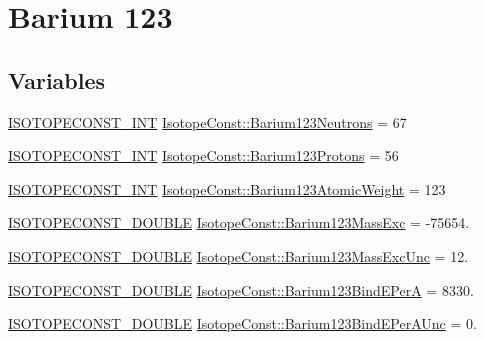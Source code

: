 \hypertarget{group___isotope_const-_barium-_ba123}{}\section{Barium 123}
\label{group___isotope_const-_barium-_ba123}
\subsection*{Variables}
\begin{DoxyCompactItemize}
\item 
\mbox{\hyperlink{group___isotope_const-_macros_ga5f18360b3e99483a35c32d789e62621c}{I\+S\+O\+T\+O\+P\+E\+C\+O\+N\+S\+T\+\_\+\+I\+NT}} \mbox{\hyperlink{group___isotope_const-_barium-_ba123_ga14435cc2003caa169279a4ffc244e4de}{Isotope\+Const\+::\+Barium123\+Neutrons}} = 67
\item 
\mbox{\hyperlink{group___isotope_const-_macros_ga5f18360b3e99483a35c32d789e62621c}{I\+S\+O\+T\+O\+P\+E\+C\+O\+N\+S\+T\+\_\+\+I\+NT}} \mbox{\hyperlink{group___isotope_const-_barium-_ba123_ga71c5c894797ec8bb11398a098c2d9287}{Isotope\+Const\+::\+Barium123\+Protons}} = 56
\item 
\mbox{\hyperlink{group___isotope_const-_macros_ga5f18360b3e99483a35c32d789e62621c}{I\+S\+O\+T\+O\+P\+E\+C\+O\+N\+S\+T\+\_\+\+I\+NT}} \mbox{\hyperlink{group___isotope_const-_barium-_ba123_gafa4c5d3ec3ad05ae329e857c1d85517e}{Isotope\+Const\+::\+Barium123\+Atomic\+Weight}} = 123
\item 
\mbox{\hyperlink{group___isotope_const-_macros_ga8f45a7272ce02c0b4c65c44636ed719a}{I\+S\+O\+T\+O\+P\+E\+C\+O\+N\+S\+T\+\_\+\+D\+O\+U\+B\+LE}} \mbox{\hyperlink{group___isotope_const-_barium-_ba123_ga63a7cc06bec4273fb409c4a6e903a99b}{Isotope\+Const\+::\+Barium123\+Mass\+Exc}} = -\/75654.
\item 
\mbox{\hyperlink{group___isotope_const-_macros_ga8f45a7272ce02c0b4c65c44636ed719a}{I\+S\+O\+T\+O\+P\+E\+C\+O\+N\+S\+T\+\_\+\+D\+O\+U\+B\+LE}} \mbox{\hyperlink{group___isotope_const-_barium-_ba123_gafeefe702a28c158415e2f36e984e4d90}{Isotope\+Const\+::\+Barium123\+Mass\+Exc\+Unc}} = 12.
\item 
\mbox{\hyperlink{group___isotope_const-_macros_ga8f45a7272ce02c0b4c65c44636ed719a}{I\+S\+O\+T\+O\+P\+E\+C\+O\+N\+S\+T\+\_\+\+D\+O\+U\+B\+LE}} \mbox{\hyperlink{group___isotope_const-_barium-_ba123_ga37dea9f1f058a7848f7d319e538e6359}{Isotope\+Const\+::\+Barium123\+Bind\+E\+PerA}} = 8330.
\item 
\mbox{\hyperlink{group___isotope_const-_macros_ga8f45a7272ce02c0b4c65c44636ed719a}{I\+S\+O\+T\+O\+P\+E\+C\+O\+N\+S\+T\+\_\+\+D\+O\+U\+B\+LE}} \mbox{\hyperlink{group___isotope_const-_barium-_ba123_ga83003b0c7d58f2e2a860fb23d0482be8}{Isotope\+Const\+::\+Barium123\+Bind\+E\+Per\+A\+Unc}} = 0.

\end{DoxyCompactItemize}
